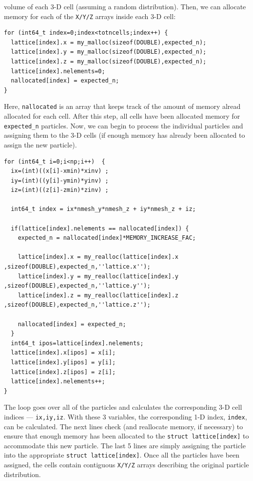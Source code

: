 \documentclass[12pt,titlepage]{article}
\begin{document}
volume of each 3-D cell (assuming a random distribution). Then, we can allocate memory for each of the \texttt{X/Y/Z} arrays inside each 3-D cell:
\begin{lstlisting}[label={code:malloc_cellarray},caption={Pre-allocating memory for the \texttt{X/Y/Z} arrays in \texttt{struct cellarray}.}]
for (int64_t index=0;index<totncells;index++) {
  lattice[index].x = my_malloc(sizeof(DOUBLE),expected_n);
  lattice[index].y = my_malloc(sizeof(DOUBLE),expected_n);
  lattice[index].z = my_malloc(sizeof(DOUBLE),expected_n);
  lattice[index].nelements=0;
  nallocated[index] = expected_n;
}
\end{lstlisting}
Here, \texttt{nallocated} is an array that keeps track of the amount of memory alread allocated for each cell. After this step, all cells have been allocated memory for \texttt{expected\_n} 
particles. Now, we can begin to process the individual particles and assigning them to the 3-D cells (if enough memory has already been allocated to assign the new particle). 
\begin{lstlisting}[label={code:assign_to_cellarray},caption={Assigning the particles to the \texttt{struct cellarray} in the cell.}]
for (int64_t i=0;i<np;i++)  {
  ix=(int)((x[i]-xmin)*xinv) ;
  iy=(int)((y[i]-ymin)*yinv) ;
  iz=(int)((z[i]-zmin)*zinv) ;

  int64_t index = ix*nmesh_y*nmesh_z + iy*nmesh_z + iz;
  
  if(lattice[index].nelements == nallocated[index]) {
    expected_n = nallocated[index]*MEMORY_INCREASE_FAC;
    
    lattice[index].x = my_realloc(lattice[index].x ,sizeof(DOUBLE),expected_n,''lattice.x'');
    lattice[index].y = my_realloc(lattice[index].y ,sizeof(DOUBLE),expected_n,''lattice.y'');
    lattice[index].z = my_realloc(lattice[index].z ,sizeof(DOUBLE),expected_n,''lattice.z'');
    
    nallocated[index] = expected_n;
  }
  int64_t ipos=lattice[index].nelements;
  lattice[index].x[ipos] = x[i];
  lattice[index].y[ipos] = y[i];
  lattice[index].z[ipos] = z[i];
  lattice[index].nelements++;
}
\end{lstlisting}
The loop goes over all of the particles and calculates the corresponding 3-D cell indices --- \texttt{ix,iy,iz}. With these 3 variables, the corresponding 1-D index, \texttt{index}, can be 
calculated. The next lines check (and reallocate memory, if necessary) to ensure that enough memory has been allocated to the \texttt{struct lattice[index]} to accommodate this new particle. 
The last 5 lines are simply assigning the particle into the appropriate \texttt{struct lattice[index]}. Once all the particles have been assigned, the cells contain contiguous \texttt{X/Y/Z} 
arrays describing the original particle distribution. 
\end{document}
